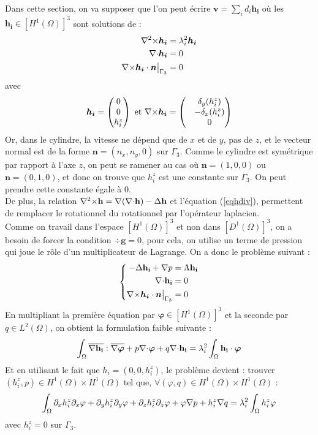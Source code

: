 Dans cette section, on va supposer que l'on peut écrire $\bm{v}=\sum_i d_i \bm{h_i}$ où les $\bm{h_i}\in [H^1(\Omega)]^3$ sont solutions de :
\begin{align}
{\nabla^2\times}\bm{h_i} &= \lambda^2_i \bm{h_i}\nonumber\\
{\nabla\cdot} \bm{h_i} &= 0 \label{eqhdiv}\\
{\nabla\times}\bm{h_i}\cdot\bm{n}\big\rvert_{\Gamma_3} &= 0\nonumber
\end{align}
avec
\[
\bm{h_i}=
\begin{pmatrix}
0\\
0\\
h_i^z
\end{pmatrix}
\text{ et }
{\nabla\times}\bm{h_i}=
\begin{pmatrix}
&\delta_y(h_i^z)\\
&-\delta_x(h_i^z)\\
&0
\end{pmatrix}
\]
Or, dans le cylindre, la vitesse ne dépend que de $x$ et de $y$, pas de $z$, et le vecteur normal est de la forme $\bm{n}=(n_x,n_y,0)$ sur $\Gamma_3$. Comme le cylindre est symétrique par rapport à l'axe $z$, on peut se ramener au cas où $\bm{n}=(1,0,0)$ ou $\bm{n}=(0,1,0)$, et donc on trouve que $h_i^z$ est une constante sur $\Gamma_3$. On peut prendre cette constante égale à 0.\\

De plus, la relation ${\nabla^2\times} \mathbf{h} = {\nabla}({\nabla\cdot} \mathbf{h}) - {\Delta} \mathbf{h}$ et l'équation (\ref{eqhdiv}), permettent de remplacer le rotationnel du rotationnel par l'opérateur laplacien.\\
Comme on travail dans l'espace $[H^1(\Omega)]^3$ et non dans $[D^1(\Omega)]^3$, on a besoin de forcer la condition $\div\mathbf{g}=0$, pour cela, on utilise un terme de pression qui joue le rôle d'un multiplicateur de Lagrange. On a donc le problème suivant :
\begin{equation}
\left\{
\begin{aligned}
-{\Delta}\mathbf{h_i} + {\nabla} p &= \Lambda \mathbf{h_i}\\
{\nabla\cdot} \mathbf{h_i}&=0\\
{\nabla\times}\bm{h_i}\cdot\bm{n}\big\rvert_{\Gamma_3} &= 0
\end{aligned}
\right.
\end{equation}
En multipliant la première équation par $\bm{\varphi}\in [H^1(\Omega)]^3$ et la seconde par $q\in L^2(\Omega)$, on obtient la formulation faible suivante :
\begin{equation*}
\int_\Omega \overline{{\nabla}\mathbf{h_i}}:\overline{{\nabla}\bm{\varphi}} + p{\nabla\cdot}\bm{\varphi} + q{\nabla\cdot}\mathbf{h_i} = \lambda_i^2 \int_\Omega \mathbf{h_i}\cdot\bm{\varphi}
\end{equation*}
Et en utilisant le fait que $h_i=(0,0,h_i^z)$, le problème devient : trouver $(h_i^z,p)\in H^1(\Omega)\times H^1(\Omega)$ tel que, $\forall (\varphi,q)\in H^1(\Omega)\times H^1(\Omega)$ :
\[
\int_\Omega \partial_x h_i^z \partial_x\varphi + \partial_y h_i^z \partial_y\varphi + \partial_z h_i^z \partial_z\varphi + \varphi{\nabla} p + h_i^z{\nabla} q = \lambda_i^2 \int_\Omega h_i^z\varphi
\]
avec $h_i^z = 0$ sur $\Gamma_3$.\\

